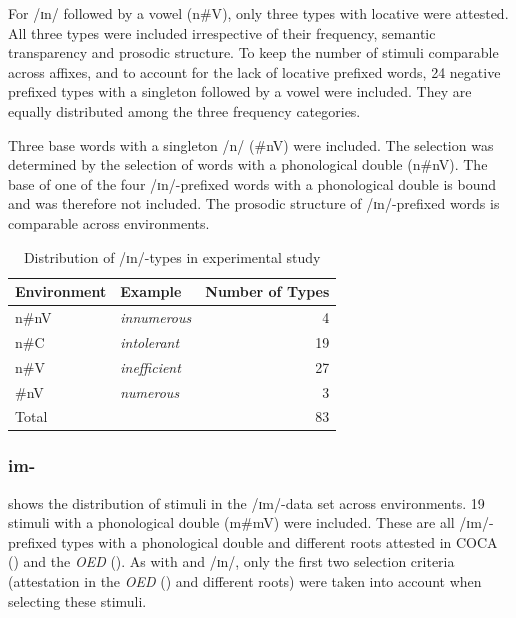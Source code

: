 For /ɪn/ followed by a vowel ({n\#V}), only three types with locative  were attested. All three types were included irrespective of their frequency, semantic transparency and prosodic structure. 
To keep the number of stimuli comparable across affixes, and to account for the lack of locative prefixed words, 24 negative prefixed types with a singleton followed by a vowel were included. They are equally distributed among the three frequency categories.  



Three base words with a singleton /n/ ({\#nV}) were included. The selection was determined by the selection of words with a phonological double ({n\#nV}). The base of one of the four /ɪn/-prefixed words with a phonological double is bound and was therefore not included. 
The prosodic structure of /ɪn/-prefixed words is comparable across environments.


\begin{table}
	\caption{Distribution of /ɪn/-types in experimental study}
	\label{tbl:distribution of in  types in experiment}

	
		\begin{tabular} {llr}

			Environment & Example & Number of  Types\\

			\midrule
			n\#nV&\color[HTML]{3166FF}\textit{innumerous} & 4 \\ 

			n\#C&\color[HTML]{3166FF}\textit{intolerant} & 19 \\ 
						n\#V&\color[HTML]{3166FF}\textit{inefficient} & 27 \\ 
			\#nV&\color[HTML]{3166FF}\textit{numerous} & 3\\ 
			\midrule   
			Total&  & 83 \\ 
			\midrule     	


		\end{tabular}
	
\end{table}


\subsubsection{im-}

 shows the distribution of  stimuli in the /ɪm/-data set across environments. 19 stimuli with a phonological double ({m\#mV}) were included. These are all /ɪm/-prefixed types with a phonological double and different roots attested in COCA (\citealt{Davies.20082014}) and the \textit{OED} (\citealt{OED.2013}). As with  and /ɪn/, only the first two selection criteria (attestation in the \textit{OED} (\citealt{OED.2013}) and different roots) were taken into account when selecting these stimuli.



